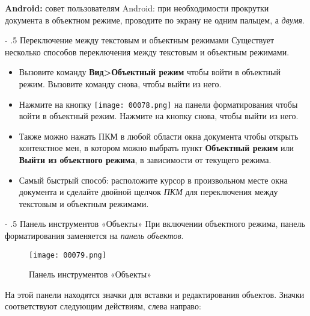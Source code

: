 ﻿\documentclass[a4paper,10pt]{article}
\makeatletter
\renewcommand\paragraph{%
   \@startsection{paragraph}{4}{0mm}%
      {-\baselineskip}%
      {.5\baselineskip}%
      {\normalfont\normalsize\bfseries}}
\makeatother
\begin{document}
\textbf{Android:} совет пользователям Android: при необходимости прокрутки документа в объектном режиме, проводите по экрану не одним пальцем, а \textit{двумя}.

\paragraph{Переключение между текстовым и объектным режимами}
Существует несколько способов переключения между текстовым и объектным режимами.

\begin{itemize}
 \item Вызовите команду \textbf{Вид>Объектный режим} чтобы войти в объектный режим. Вызовите команду снова, чтобы выйти из него.
 \item Нажмите на кнопку \texttt{[image: 00078.png]} на панели форматирования чтобы войти в объектный режим. Нажмите на кнопку снова, чтобы выйти из него.
 \item Также можно нажать ПКМ в любой области окна документа чтобы открыть контекстное мен, в котором можно выбрать пункт \textbf{Объектный режим} или \textbf{Выйти из объектного режима}, в зависимости от текущего режима.
 \item Самый быстрый способ: расположите курсор в произвольном месте окна документа и сделайте двойной щелчок \textit{ПКМ} для переключения между текстовым и объектным режимами.
\end{itemize}

\paragraph{Панель инструментов «Объекты»}
При включении объектного режима, панель форматирования заменяется на \textit{панель объектов}.

\begin{figure}[ht]
\texttt{[image: 00079.png]}
\centering
\caption{Панель инструментов «Объекты»}
\end{figure}

На этой панели находятся значки для вставки и редактирования объектов. Значки соответствуют следующим действиям, слева направо:
\end{document}
